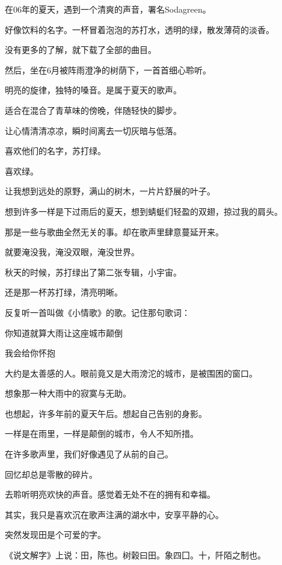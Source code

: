 \documentclass[12pt,a4paper]{article}
\def\blankrev{\vspace{1ex}}									%
\begin{document}
		在06年的夏天，遇到一个清爽的声音，署名Sodagreen。\par
		好像饮料的名字。一杯冒着泡泡的苏打水，透明的绿，散发薄荷的淡香。\par
		没有更多的了解，就下载了全部的曲目。\par
		然后，坐在6月被阵雨澄净的树荫下，一首首细心聆听。\par
		明亮的旋律，独特的嗓音。是属于夏天的歌声。\par
		适合在混合了青草味的傍晚，伴随轻快的脚步。\par
		让心情清清凉凉，瞬时间离去一切灰暗与低落。

		\blankrev
		喜欢他们的名字，苏打绿。\par
		喜欢绿。\par
		让我想到远处的原野，满山的树木，一片片舒展的叶子。\par
		想到许多一样是下过雨后的夏天，想到蜻蜓们轻盈的双翅，掠过我的肩头。\par
		那是一些与歌曲全然无关的事。却在歌声里肆意蔓延开来。\par
		就要淹没我，淹没双眼，淹没世界。

		\blankrev
		秋天的时候，苏打绿出了第二张专辑，小宇宙。\par
		还是那一杯苏打绿，清亮明晰。\par
		反复听一首叫做《小情歌》的歌。记住那句歌词：

		你知道就算大雨让这座城市颠倒

		我会给你怀抱

		\blankrev
		大约是太善感的人。眼前竟又是大雨滂沱的城市，是被围困的窗口。\par
		想象那一种大雨中的寂寞与无助。\par
		也想起，许多年前的夏天午后。想起自己告别的身影。\par
		一样是在雨里，一样是颠倒的城市，令人不知所措。\par
		在许多歌声里，我们好像遇见了从前的自己。\par
		回忆却总是零散的碎片。

		去聆听明亮欢快的声音。感觉着无处不在的拥有和幸福。

		其实，我只是喜欢沉在歌声注满的湖水中，安享平静的心。

	\endwriting



		突然发现田是个可爱的字。

		《说文解字》上说：田，陈也。树榖曰田。象四囗。十，阡陌之制也。
\end{document}
